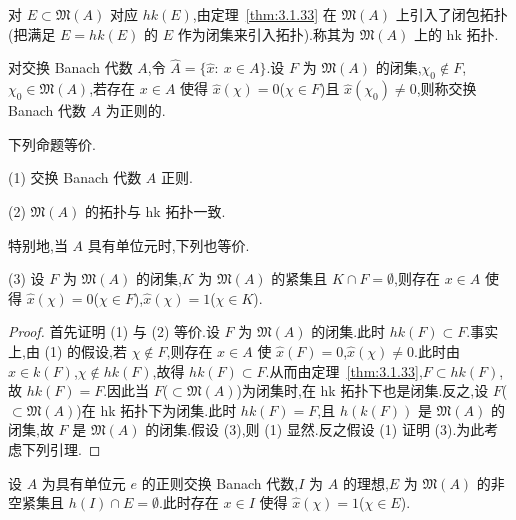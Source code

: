 \begin{definition}\label{def:3.1.34}
对 $E \subset \mathfrak{M}(A)$ 对应 $hk(E)$,由定理~\ref{thm:3.1.33} 在 $\mathfrak{M}(A)$ 上引入了闭包拓扑(把满足 $E = hk(E)$ 的 $E$ 作为闭集来引入拓扑).称其为 $\mathfrak{M}(A)$ 上的 hk 拓扑.
\end{definition}

\begin{definition}\label{def:3.1.35}
对交换 Banach 代数 $A$,令 $\hat{A} = \{\hat{x}:\ x \in A\}$.设 $F$ 为 $\mathfrak{M}(A)$ 的闭集,$\chi_{0} \notin F$,$\chi_{0} \in \mathfrak{M}(A)$,若存在 $x \in A$ 使得 $\hat{x}(\chi) = 0$($\chi \in F$)且 $\hat{x}(\chi_{0}) \neq 0$,则称交换 Banach 代数 $A$ 为正则的.
\end{definition}

\begin{theorem}\label{thm:3.1.36}
下列命题等价.

(1) 交换 Banach 代数 $A$ 正则.

(2) $\mathfrak{M}(A)$ 的拓扑与 hk 拓扑一致.

特别地,当 $A$ 具有单位元时,下列也等价.

(3) 设 $F$ 为 $\mathfrak{M}(A)$ 的闭集,$K$ 为 $\mathfrak{M}(A)$ 的紧集且 $K \cap F = \emptyset$,则存在 $x \in A$ 使得 $\hat{x}(\chi) = 0$($\chi \in F$),$\hat{x}(\chi) = 1$($\chi \in K$).
\end{theorem}

\begin{proof}
首先证明 (1) 与 (2) 等价.设 $F$ 为 $\mathfrak{M}(A)$ 的闭集.此时 $hk(F) \subset F$.事实上,由 (1) 的假设,若 $\chi \notin F$,则存在 $x \in A$ 使 $\hat{x}(F) = 0$,$\hat{x}(\chi) \neq 0$.此时由 $x \in k(F)$,$\chi \notin hk(F)$,故得 $hk(F) \subset F$.从而由定理~\ref{thm:3.1.33},$F \subset hk(F)$,故 $hk(F) = F$.因此当 $F$($\subset \mathfrak{M}(A)$)为闭集时,在 hk 拓扑下也是闭集.反之,设 $F$($\subset \mathfrak{M}(A)$)在 hk 拓扑下为闭集.此时 $hk(F) = F$,且 $h(k(F))$ 是 $\mathfrak{M}(A)$ 的闭集,故 $F$ 是 $\mathfrak{M}(A)$ 的闭集.假设 (3),则 (1) 显然.反之假设 (1) 证明 (3).为此考虑下列引理.
\end{proof}

\begin{lemma}\label{lem:3.1.37}
设 $A$ 为具有单位元 $e$ 的正则交换 Banach 代数,$I$ 为 $A$ 的理想,$E$ 为 $\mathfrak{M}(A)$ 的非空紧集且 $h(I) \cap E = \emptyset$.此时存在 $x \in I$ 使得 $\hat{x}(\chi) = 1$($\chi \in E$).
\end{lemma}

